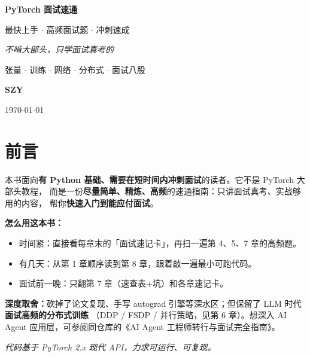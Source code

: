 \documentclass[11pt, a4paper, openany]{book}
\begin{document}
\raggedbottom

\begin{titlepage}
  \centering
  \vspace*{3cm}

  {\fontsize{34}{42}\selectfont\bfseries PyTorch 面试速通\par}
  \vspace{0.6cm}
  {\LARGE 最快上手 $\cdot$ 高频面试题 $\cdot$ 冲刺速成\par}

  \vspace{2.5cm}

  {\large\itshape 不啃大部头，只学面试真考的\par}
  \vspace{0.4cm}
  {\normalsize 张量 $\cdot$ 训练 $\cdot$ 网络 $\cdot$ 分布式 $\cdot$ 面试八股\par}

  \vfill

  {\Large\bfseries SZY\par}
  \vspace{0.3cm}
  {\normalsize \today\par}
  \vspace{2cm}
\end{titlepage}

\chapter*{前言}

本书面向\textbf{有 Python 基础、需要在短时间内冲刺面试}的读者。它不是 PyTorch 大部头教程，
而是一份\textbf{尽量简单、精炼、高频}的速通指南：只讲面试真考、实战够用的内容，
帮你\textbf{快速入门到能应付面试}。

\textbf{怎么用这本书：}
\begin{itemize}[leftmargin=2em]
  \item 时间紧：直接看每章末的「面试速记卡」，再扫一遍第 4、5、7 章的高频题。
  \item 有几天：从第 1 章顺序读到第 8 章，跟着敲一遍最小可跑代码。
  \item 面试前一晚：只翻第 7 章（速查表+坑）和各章速记卡。
\end{itemize}

\textbf{深度取舍：}砍掉了论文复现、手写 autograd 引擎等深水区；但保留了 LLM 时代\textbf{面试高频的分布式训练}
（DDP / FSDP / 并行策略，见第 6 章）。想深入 AI Agent 应用层，可参阅同仓库的《AI Agent 工程师转行与面试完全指南》。

\vspace{0.5em}
\noindent\textit{代码基于 PyTorch 2.x 现代 API，力求可运行、可复现。}

\tableofcontents
\newpage









\end{document}
